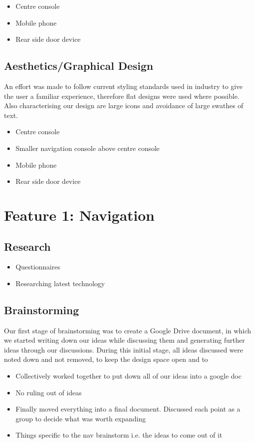 \documentclass{article}
\begin{document}
\begin{itemize}
    \begin{itemize}
      \item Centre console
      \item Mobile phone
      \item Rear side door device
    \end{itemize}
\subsection{Aesthetics/Graphical Design}
An effort was made to follow current styling standards used in industry to give the user a familiar experience, therefore flat designs were used where possible. Also characterising our design are large icons and avoidance of large swathes of text.  
    
    \begin{itemize}
		\item Centre console
        \item Smaller navigation console above centre console
        \item Mobile phone
        \item Rear side door device
	\end{itemize}
\section{Feature 1: Navigation}
\subsection{Research}
  \begin{itemize}
    \item Questionnaires
    \item Researching latest technology
  \end{itemize}
\subsection{Brainstorming}
Our first stage of brainstorming was to create a Google Drive document, in which we started writing down our ideas while discussing them and generating further ideas through our discussions. During this initial stage, all ideas discussed were noted down and not removed, to keep the design space open and to 
	\begin{itemize}
		\item Collectively worked together to put down all of our ideas into a google doc
		\item No ruling out of ideas
		\item Finally moved everything into a final document. Discussed each point as a group to decide what was worth expanding
        \item Things specific to the nav brainstorm i.e. the ideas to come out of it
	\end{itemize}

\end{itemize}
\end{document}
